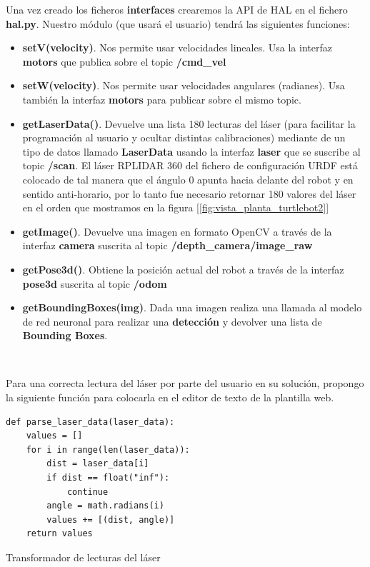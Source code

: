Una vez creado los ficheros \textbf{interfaces} crearemos la API de HAL en el fichero \textbf{hal.py}. Nuestro módulo (que usará el usuario) tendrá las siguientes funciones:\\
\begin{itemize}
	\item \textbf{setV(velocity)}. Nos permite usar velocidades lineales. Usa la interfaz \textbf{motors} que publica sobre el topic \textbf{/cmd\_vel}
	\item \textbf{setW(velocity)}. Nos permite usar velocidades angulares (radianes). Usa también la interfaz \textbf{motors} para publicar sobre el mismo topic.
	\item \textbf{getLaserData()}. Devuelve una lista 180 lecturas del láser (para facilitar la programación al usuario y ocultar distintas calibraciones) mediante de un tipo de datos llamado \textbf{LaserData} usando la interfaz \textbf{laser} que se suscribe al topic \textbf{/scan}. El láser RPLIDAR 360 del fichero de configuración URDF está colocado de tal manera que el ángulo 0 apunta hacia delante del robot y en sentido anti-horario, por lo tanto fue necesario retornar 180 valores del láser en el orden que mostramos en la figura [\ref{fig:vista_planta_turtlebot2}]
	\item \textbf{getImage()}. Devuelve una imagen en formato OpenCV a través de la interfaz \textbf{camera} suscrita al topic \textbf{/depth\_camera/image\_raw}
	\item \textbf{getPose3d()}. Obtiene la posición actual del robot a través de la interfaz \textbf{pose3d} suscrita al topic \textbf{/odom}
	\item \textbf{getBoundingBoxes(img)}. Dada una imagen realiza una llamada al modelo de red neuronal para realizar una \textbf{detección} y devolver una lista de \textbf{Bounding Boxes}.  
\end{itemize}\

Para una correcta lectura del láser por parte del usuario en su solución, propongo la siguiente función para colocarla en el editor de texto de la plantilla web.\\

\begin{code}[H]
\begin{lstlisting}
def parse_laser_data(laser_data):
    values = []
    for i in range(len(laser_data)):
        dist = laser_data[i]
        if dist == float("inf"):
            continue
        angle = math.radians(i)
        values += [(dist, angle)]
    return values
\end{lstlisting}
\caption[Transformador de lecturas del láser]{Transformador de lecturas del láser}
\label{cod:parse_laser_data}
\end{code}\

